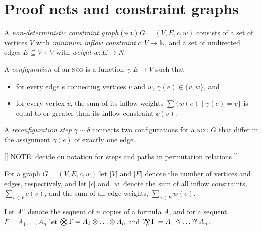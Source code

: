 \section{Proof nets and constraint graphs}


\newcommand\itn[1]{\llbracket#1\rrbracket}
\newcommand\coitn[1]{\llparenthesis#1\rrparenthesis}

\begin{definition}
A \emph{non-deterministic constraint graph} (\textsc{ncg}) $G=(V,E,c,w)$ consists of a set of vertices $V$ with \emph{minimum inflow constraint} $c\colon V\to\mathbb N$, and a set of undirected edges $E\subseteq V\times V$ with \emph{weight} $w\colon E\to N$.

A \emph{configuration} of an \textsc{ncg} is a function $\gamma\colon E\to V$ such that
\begin{itemize}
	\item
for every edge $e$ connecting vertices $v$ and $w$, $\gamma(e)\in\{v,w\}$, and
	\item
for every vertex $v$, the sum of its inflow weights $\sum\{w(e)\mid \gamma(e)=v\}$ is equal to or greater than its inflow constraint $c(v)$.
\end{itemize}

A \emph{reconfiguration step} $\gamma\sim\delta$ connects two configurations for a \textsc{ncg} $G$ that differ in the assignment $\gamma(e)$ of exactly one edge.

\end{definition}

[[ NOTE: decide on notation for steps and paths in permutation relations ]]

For a graph $G=(V,E,c,w)$ let $|V|$ and $|E|$ denote the number of vertices and edges, respectively, and let $|c|$ and $|w|$ denote the sum of all inflow constraints, $\sum_{v\in V}c(v)$, and the sum of all edge weights, $\sum_{e\in E}w(e)$.


Let $A^n$ denote the sequent of $n$ copies of a formula $A$, and for a sequent $\Gamma=A_1,\dotsc,A_n$ let $\bigotimes\Gamma=A_1\otimes\dotso\otimes A_n$ and $\bigparr\Gamma=A_1\parr\dotso\parr A_n$.



